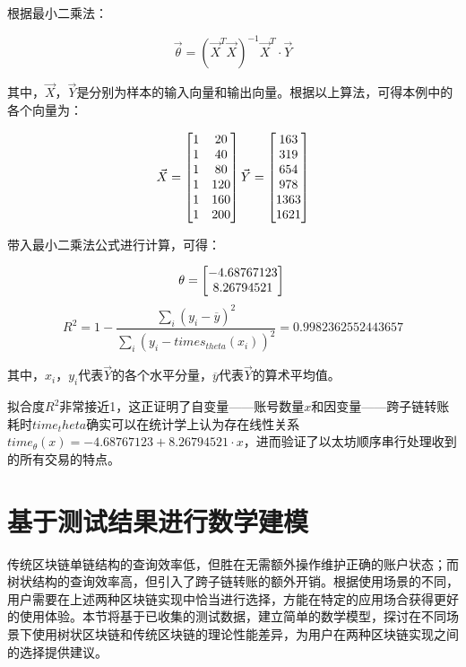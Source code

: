 根据最小二乘法：

$$
    \vec{\theta} = (\vec{X}^T \vec{X})^{-1}\vec{X}^T \cdot \vec{Y}
$$

其中，$\vec{X}$，$\vec{Y}$是分别为样本的输入向量和输出向量。根据以上算法，可得本例中的各个向量为：

$$
    \vec{X} = \begin{bmatrix}
        1 & 20 \\ 1 & 40 \\ 1 & 80 \\ 1 & 120 \\ 1 & 160 \\ 1 & 200
    \end{bmatrix} \\
    \vec{Y} = \begin{bmatrix}
        163 \\ 319 \\ 654 \\ 978 \\ 1363 \\ 1621
    \end{bmatrix}
$$

带入最小二乘法公式进行计算，可得：

$$
    \theta = \begin{bmatrix}
        -4.68767123 \\
        8.26794521
    \end{bmatrix} \\
$$
$$
    R^2 = 1 - \frac{\sum_i (y_i - \overline{y})^2}{\sum_i (y_i - times_{theta}(x_i))^2} = 0.9982362552443657
$$

其中，$x_i$，$y_i$代表$\vec{Y}$的各个水平分量，$\overline{y}$代表$\vec{Y}$的算术平均值。

拟合度$R^2$非常接近1，这正证明了自变量——账号数量$x$和因变量——跨子链转账耗时$time_theta$确实可以在统计学上认为存在线性关系$time_{\theta}(x) = -4.68767123 + 8.26794521 \cdot x$，进而验证了以太坊顺序串行处理收到的所有交易的特点。

\section{基于测试结果进行数学建模}

传统区块链单链结构的查询效率低，但胜在无需额外操作维护正确的账户状态；而树状结构的查询效率高，但引入了跨子链转账的额外开销。根据使用场景的不同，用户需要在上述两种区块链实现中恰当进行选择，方能在特定的应用场合获得更好的使用体验。本节将基于已收集的测试数据，建立简单的数学模型，探讨在不同场景下使用树状区块链和传统区块链的理论性能差异，为用户在两种区块链实现之间的选择提供建议。

